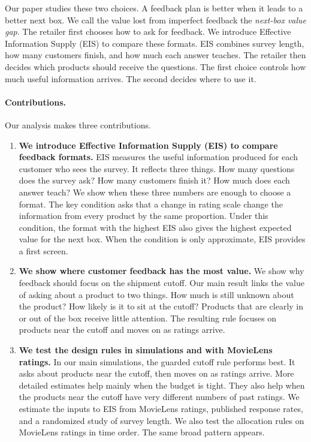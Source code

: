 \documentclass[11pt]{article}
\theoremstyle{definition}
\theoremstyle{remark}
\newcommand{\1}{\mathbf{1}}
\begin{document}
Our paper studies these two choices. A feedback plan is better when it
leads to a better next box. We call the value lost from imperfect
feedback the \emph{next-box value gap}. The retailer first chooses how
to ask for feedback. We introduce Effective Information Supply (EIS) to
compare these formats. EIS combines survey length, how many customers
finish, and how much each answer teaches. The retailer then decides which
products should receive the questions. The first choice controls how much
useful information arrives. The second decides where to use it.

\paragraph{Contributions.}
Our analysis makes three contributions.
\begin{enumerate}[leftmargin=*]
\item \textbf{We introduce Effective Information Supply (EIS) to compare
feedback formats.}
EIS measures the useful information produced for each customer who sees
the survey. It reflects three things. How many questions does the survey
ask? How many customers finish it? How much does each answer teach? We show when these three numbers are enough to choose a format. The key
condition asks that a change in rating scale change the information from
every product by the same proportion. Under this condition, the
format with the highest EIS also gives the highest expected value for
the next box. When the condition is only approximate, EIS provides a
first screen.

\item \textbf{We show where customer feedback has the most value.}
We show why feedback should focus on the shipment cutoff. Our main result
links the value of asking about a product to two things. How much is
still unknown about the product? How likely is it to sit at the cutoff?
Products that are clearly in or out of the box receive little attention.
The resulting rule focuses on products near the cutoff and moves on as
ratings arrive.

\item \textbf{We test the design rules in simulations and with MovieLens
ratings.}
In our main simulations, the guarded cutoff rule performs best. It asks
about products near the cutoff, then moves on as ratings arrive. More
detailed estimates help mainly when the budget is tight. They also help
when the products near the cutoff have very different numbers of past
ratings. We estimate the inputs to EIS from MovieLens ratings, published
response rates, and a randomized study of survey length. We also test
the allocation rules on MovieLens ratings in time order. The same broad
pattern appears.
\end{enumerate}
\end{document}
